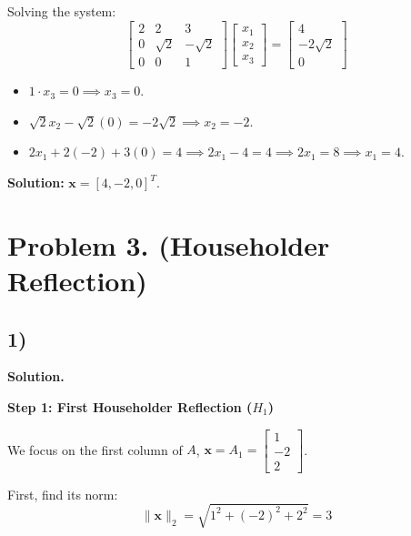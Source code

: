 \documentclass{article}
\newcommand{\0}{{\mathbf{0}}} %
\newcommand{\vect}[1]{\mathbf{#1}}
\begin{document}
Solving the system:
\[
\begin{bmatrix} 2 & 2 & 3 \\ 0 & \sqrt{2} & -\sqrt{2} \\ 0 & 0 & 1
\end{bmatrix}
\begin{bmatrix} x_1 \\ x_2 \\ x_3
\end{bmatrix} =
\begin{bmatrix} 4 \\ -2\sqrt{2} \\ 0
\end{bmatrix}
\]

\begin{itemize}
\item $1 \cdot x_3 = 0 \implies x_3 = 0$.
\item $\sqrt{2}x_2 - \sqrt{2}(0) = -2\sqrt{2} \implies x_2 = -2$.
\item $2x_1 + 2(-2) + 3(0) = 4 \implies 2x_1 - 4 = 4 \implies 2x_1 = 8 \implies x_1 = 4$.
\end{itemize}

\textbf{Solution:} $\mathbf{x} = [4, -2, 0]^T$.

\section*{Problem 3. (Householder Reﬂection)}

\subsection*{1)}
\textbf{Solution.}

\textbf{Step 1: First Householder Reflection ($H_1$)}

We focus on the first column of $A$, $\vect{x} = A_1 =
\begin{bmatrix} 1 \\ -2 \\ 2
\end{bmatrix}$.

First, find its norm:
$$ \|\vect{x}\|_2 = \sqrt{1^2 + (-2)^2 + 2^2} = 3 $$
\end{document}
